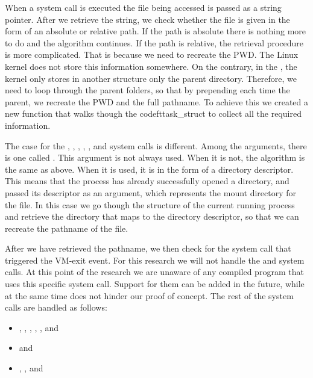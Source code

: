 \par When a system call is executed the file being accessed is passed as a string pointer. After we retrieve the string, we check whether the file is given in the form of an absolute or relative path. If the path is absolute there is nothing more to do and the algorithm continues. If the path is relative, the retrieval procedure is more complicated. That is because we need to recreate the \ac{PWD}. The Linux kernel does not store this information somewhere. On the contrary, in the , the kernel only stores in another structure only the parent directory. Therefore, we need to loop through the parent folders, so that by prepending each time the parent, we recreate the \ac{PWD} and the full pathname. To achieve this we created a new function that walks though the codeft{task\_struct} to collect all the required information. 

\par The case for the , , , , , and  system calls is different. Among the arguments, there is one called . This argument is not always used. When it is not, the algorithm is the same as above. When it is used, it is in the form of a directory descriptor. This means that the process has already successfully opened a directory, and passed its descriptor as an argument, which represents the mount directory for the file. In this case we go though the  structure of the current running process and retrieve the directory that maps to the directory descriptor, so that we can recreate the pathname of the file.

\par After we have retrieved the pathname, we then check for the system call that triggered the VM-exit event. For this research we will not handle the  and  system calls. At this point of the research we are unaware of any compiled program that uses this specific system call. Support for them can be added in the future, while at the same time does not hinder our proof of concept. The rest of the system calls are handled as follows: 


\begin{itemize}
	\item {}, , , , , and 
	\item {} and 
	\item {}, , and 
\end{itemize}

